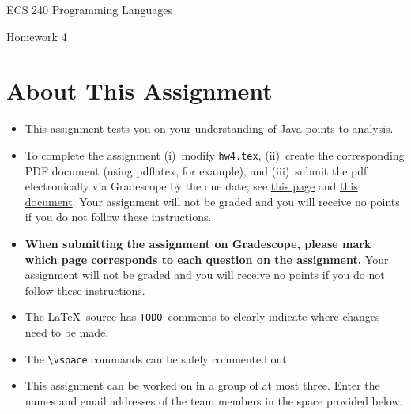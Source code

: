 \documentclass[12pt]{article}
\begin{document}
    
    \begin{center}
        \bigskip
        {\LARGE ECS 240 Programming Languages} \medskip
                
        {\Large Homework 4} \bigskip
    
    \end{center}
    
    \section*{About This Assignment}
    
    \begin{itemize}
      \item This assignment tests you on your understanding of Java points-to
      analysis.
      \item To complete the assignment 
            (i)~modify \texttt{hw4.tex}, 
            (ii)~create the corresponding PDF document (using pdflatex, for example), and 
            (iii)~submit the pdf electronically via Gradescope by the due date; 
            see \href{https://www.gradescope.com/get_started#student-submission}{this page} and
            \href{http://gradescope-static-assets.s3-us-west-2.amazonaws.com/help/submitting_hw_guide.pdf}{this document}.
            Your assignment will not be graded and you will receive
            no points if you do not follow these instructions. 
      \item \textbf{When submitting the assignment on Gradescope, please mark which page
        corresponds to each question on the assignment.} Your assignment will not be graded and you will receive
        no points if you do not follow these instructions. 
      \item The \LaTeX\ source has \texttt{TODO}~comments to clearly
        indicate where changes need to be made. 
      \item The \verb=\vspace= commands can be safely commented out.
      \item This assignment can be worked on in a group of at most three. Enter
      the names and email addresses of the team members in the space provided
      below.
    \end{itemize}
\end{document}
